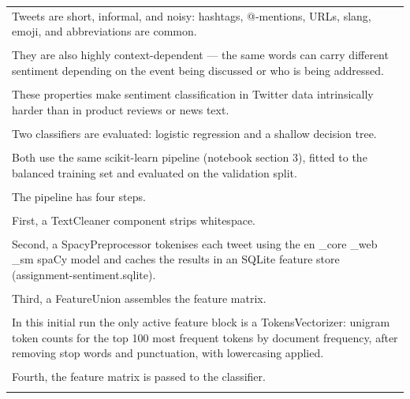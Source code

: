 \documentclass[11pt,a4paper,landscape]{article}
\begin{document}
\begin{longtable}{|p{\dimexpr\linewidth-2\tabcolsep-2\arrayrulewidth\relax}|}
\hline
\rule{0pt}{3.5cm} \\
\hline
Tweets are short, informal, and noisy: hashtags, @-mentions, URLs, slang, emoji, and abbreviations are common. \\[2pt]
\hline
\rule{0pt}{3.5cm} \\
\hline
They are also highly context-dependent --- the same words can carry different sentiment depending on the event being discussed or who is being addressed. \\[2pt]
\hline
\rule{0pt}{3.5cm} \\
\hline
These properties make sentiment classification in Twitter data intrinsically harder than in product reviews or news text. \\[2pt]
\hline
\rule{0pt}{3.5cm} \\
\hline
Two classifiers are evaluated: logistic regression and a shallow decision tree. \\[2pt]
\hline
\rule{0pt}{3.5cm} \\
\hline
Both use the same scikit-learn pipeline (notebook section 3), fitted to the balanced training set and evaluated on the validation split. \\[2pt]
\hline
\rule{0pt}{3.5cm} \\
\hline
The pipeline has four steps. \\[2pt]
\hline
\rule{0pt}{3.5cm} \\
\hline
First, a TextCleaner component strips whitespace. \\[2pt]
\hline
\rule{0pt}{3.5cm} \\
\hline
Second, a SpacyPreprocessor tokenises each tweet using the en \_core \_web \_sm spaCy model and caches the results in an SQLite feature store (assignment-sentiment.sqlite). \\[2pt]
\hline
\rule{0pt}{3.5cm} \\
\hline
Third, a FeatureUnion assembles the feature matrix. \\[2pt]
\hline
\rule{0pt}{3.5cm} \\
\hline
In this initial run the only active feature block is a TokensVectorizer: unigram token counts for the top 100 most frequent tokens by document frequency, after removing stop words and punctuation, with lowercasing applied. \\[2pt]
\hline
\rule{0pt}{3.5cm} \\
\hline
Fourth, the feature matrix is passed to the classifier. \\[2pt]
\hline
\rule{0pt}{3.5cm} \\

\end{longtable}
\end{document}
